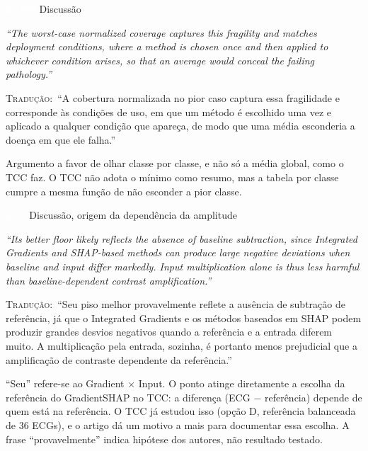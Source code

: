 \documentclass[11pt,a4paper]{article}
\newcommand{\pagechip}[1]{{\setlength{\fboxsep}{1.5pt}\colorbox{cAcc}{\textcolor{white}{\scriptsize\texttt{#1}}}}}
\newenvironment{origquote}{\par\itshape\small}{\par}
\newenvironment{tradquote}{\par\small\textsc{Tradução:}\ }{\par}
\newcommand{\explab}[1]{\par\smallskip{\small\color{cAcc}\textbf{\MakeUppercase{#1}}}\par}
\begin{document}
\begin{citacard}{\pagechip{p. 6--7} Discussão}
\begin{origquote}“The worst-case normalized coverage captures this fragility and matches deployment conditions, where a method is chosen once and then applied to whichever condition arises, so that an average would conceal the failing pathology.”\end{origquote}
\begin{tradquote}“A cobertura normalizada no pior caso captura essa fragilidade e corresponde às condições de uso, em que um método é escolhido uma vez e aplicado a qualquer condição que apareça, de modo que uma média esconderia a doença em que ele falha.”\end{tradquote}
\explab{Explicação}
Argumento a favor de olhar classe por classe, e não só a média global, como o TCC faz. O TCC não adota o mínimo como resumo, mas a tabela por classe cumpre a mesma função de não esconder a pior classe.
\end{citacard}

\begin{citacard}{\pagechip{p. 7} Discussão, origem da dependência da amplitude}
\begin{origquote}“Its better floor likely reflects the absence of baseline subtraction, since Integrated Gradients and SHAP-based methods can produce large negative deviations when baseline and input differ markedly. Input multiplication alone is thus less harmful than baseline-dependent contrast amplification.”\end{origquote}
\begin{tradquote}“Seu piso melhor provavelmente reflete a ausência de subtração de referência, já que o Integrated Gradients e os métodos baseados em SHAP podem produzir grandes desvios negativos quando a referência e a entrada diferem muito. A multiplicação pela entrada, sozinha, é portanto menos prejudicial que a amplificação de contraste dependente da referência.”\end{tradquote}
\explab{Explicação}
“Seu” refere-se ao Gradient $\times$ Input. O ponto atinge diretamente a escolha da referência do GradientSHAP no TCC: a diferença (ECG $-$ referência) depende de quem está na referência. O TCC já estudou isso (opção D, referência balanceada de 36 ECGs), e o artigo dá um motivo a mais para documentar essa escolha. A frase “provavelmente” indica hipótese dos autores, não resultado testado.
\end{citacard}
\end{document}
